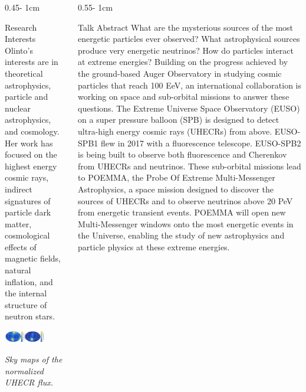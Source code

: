 \documentclass{../psuposter}
\begin{document}
\begin{frame}
\begin{columns}[t, totalwidth=\textwidth]
\begin{column}{0.45\textwidth - 1cm}
    \begin{block}{Research Interests}
        Olinto's interests are in theoretical astrophysics, particle and nuclear astrophysics, and cosmology. Her work has focused on the highest energy cosmic rays, indirect signatures of particle dark matter, cosmological effects of magnetic fields, natural inflation, and the internal structure of neutron stars. 
        \begin{center}
	    	\includegraphics[width=0.65\textwidth]{images/research}    		
	    	
	    	\textit{Sky maps of the normalized UHECR flux. \cite{olintoPOEMMAProbeExtreme2020}} 
    	\end{center}
    	
    \end{block}
\end{column}
\begin{column}{0.55\textwidth - 1cm}


    \begin{block}{Talk Abstract}
    	What are the mysterious sources of the most energetic particles ever observed? What astrophysical sources produce very energetic neutrinos? How do particles interact at extreme energies?
		Building on the progress achieved by the ground-based Auger Observatory in studying cosmic particles that reach 100 EeV, an international collaboration is working on space and sub-orbital missions to answer these questions. The Extreme Universe Space Observatory (EUSO) on a super pressure balloon (SPB) is designed to detect ultra-high energy cosmic rays (UHECRs) from above. EUSO-SPB1 flew in 2017 with a fluorescence telescope. EUSO-SPB2 is being built to observe both fluorescence and Cherenkov from UHECRs and neutrinos. These sub-orbital missions lead to POEMMA, the Probe Of Extreme Multi-Messenger Astrophysics, a space mission designed to discover the sources of UHECRs and to observe neutrinos above 20 PeV from energetic transient events. POEMMA will open new Multi-Messenger windows onto the most energetic events in the Universe, enabling the study of new astrophysics and particle physics at these extreme energies.
    \end{block}



\end{column}
\end{columns}
\end{frame}
\end{document}
